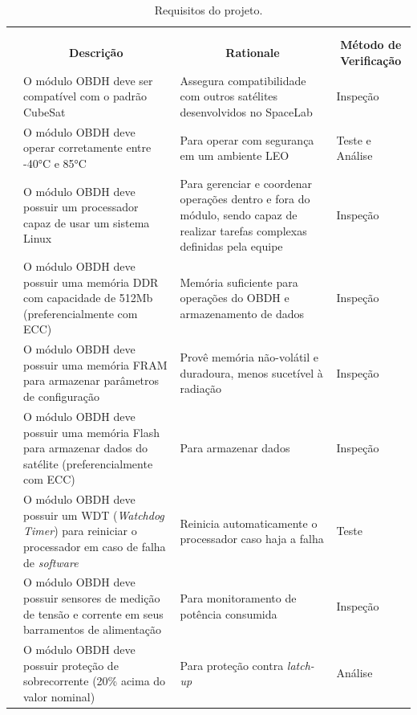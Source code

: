 \begin{longtable}{@{}>{\centering}p{1.5cm}p{4cm}p{4cm}p{4.7cm}@{}}
    \centering
	\ABNTEXfontereduzida
	\label{tab:Tab_Req}\tabularnewline
	\caption{Requisitos do projeto.}\tabularnewline
	\hline
	\multicolumn{1}{c}{\textbf{Índice}} & \multicolumn{1}{c}{\textbf{Descrição}} & \multicolumn{1}{c}{\textbf{Rationale}} & \multicolumn{1}{c}{\textbf{Método de Verificação}} \tabularnewline
        \hline
        1 & O módulo OBDH deve ser compatível com o padrão CubeSat & Assegura compatibilidade com outros satélites desenvolvidos no SpaceLab & Inspeção \tabularnewline
        
       \hline
        2 & O módulo OBDH deve operar corretamente entre -40°C e 85°C & Para operar com segurança em um ambiente LEO & Teste e Análise \tabularnewline

       \hline
       3 & O módulo OBDH deve possuir um processador capaz de usar um sistema Linux & Para gerenciar e coordenar operações dentro e fora do módulo, sendo capaz de realizar tarefas complexas definidas pela equipe  & Inspeção \tabularnewline

       \hline
        4 & O módulo OBDH deve possuir uma memória DDR com capacidade de 512Mb (preferencialmente com ECC)  & Memória suficiente para operações do OBDH e armazenamento de dados  & Inspeção\tabularnewline

        \hline
       5 & O módulo OBDH deve possuir uma memória FRAM para armazenar parâmetros de configuração & Provê memória não-volátil e duradoura, menos sucetível à radiação & Inspeção \tabularnewline 

        \hline
        6 & O módulo OBDH deve possuir uma memória Flash para armazenar dados do satélite (preferencialmente com ECC) & Para armazenar dados & Inspeção \tabularnewline 

        \hline
       7 & O módulo OBDH deve possuir um WDT (\textit{Watchdog Timer}) para reiniciar o processador em caso de falha de \textit{software} & Reinicia automaticamente o processador caso haja a falha  & Teste \tabularnewline

        \hline
       8 & O módulo OBDH deve possuir sensores de medição de tensão e corrente em seus barramentos de alimentação & Para monitoramento de potência consumida & Inspeção \tabularnewline

        \hline
      9 &  O módulo OBDH deve possuir proteção de sobrecorrente (20\% acima do valor nominal) & Para proteção contra \textit{latch-up}  & Análise \tabularnewline


\end{longtable}

